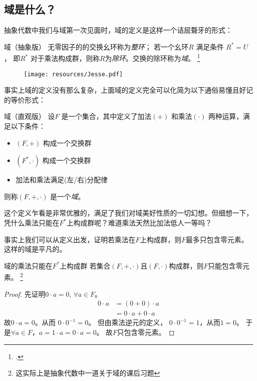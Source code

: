 \subsection{域是什么？}

抽象代数中我们与域第一次见面时，域的定义是这样一个诘屈聱牙的形式：
\begin{definition}{域（抽象版）}
    无零因子的的交换幺环称为\emph{整环}； 若一个幺环\(R\) 满足条件 \(R^{*}=U\)，
    即\(R^{*}\) 对于乘法构成群，则称\(R\)为\emph{除环}。交换的除环称为\emph{域}。
    \footcite[定义~2.2.20]{抽象代数}
\end{definition}

\begin{figure}[H]
    \centering
    \texttt{[image: resources/Jesse.pdf]}
\end{figure}
事实上域的定义没有那么复杂，上面域的定义完全可以化简为以下通俗易懂且好记的等价形式：
\begin{definition}{域（直观版）}
    设\(F\) 是一个集合，其中定义了加法\((+)\) 和乘法\((\cdot)\) 两种运算，满足以下条件：
    \begin{itemize}
        \item \((F, +)\) 构成一个交换群
        \item \((F^{*}, \cdot)\) 构成一个交换群
        \item 加法和乘法满足(左/右)分配律
    \end{itemize}
    则称\((F, +, \cdot)\) 是一个\emph{域}。
\end{definition}

这个定义乍看是非常优雅的，满足了我们对域美好性质的一切幻想。但细想一下，
凭什么乘法只能在\(F^{*}\)上构成群呢？难道乘法天然比加法低人一等吗？

事实上我们可以从定义出发，证明若乘法在\(F\)上构成群，则\(F\)最多只包含零元素。这样的域是平凡的。

\begin{theorem}{域的乘法只能在\(F^{*}\)上构成群}
    若集合\((F, + ,\cdot)\)且\((F,\cdot)\)构成群，则\(F\)只能包含零元素。
    \footnote{这实际上是抽象代数中一道关于域的课后习题}
\end{theorem}

\begin{proof}
    先证明\(0 \cdot a=0\), \(\forall a \in F\)。
    \begin{align*}
        0 \cdot a &= (0+0) \cdot a\\
        &= 0 \cdot a + 0 \cdot a
    \end{align*}
    故\(0 \cdot a=0\)。从而 \(0\cdot 0^{-1}=0\)。
    但由乘法逆元的定义， \(0 \cdot 0^{-1}=1\)，从而\(1=0\)。
    于是\(\forall a \in F\)，\(a=1 \cdot a=0 \cdot a=0\)。
    故\(F\)只包含零元素。
\end{proof}

